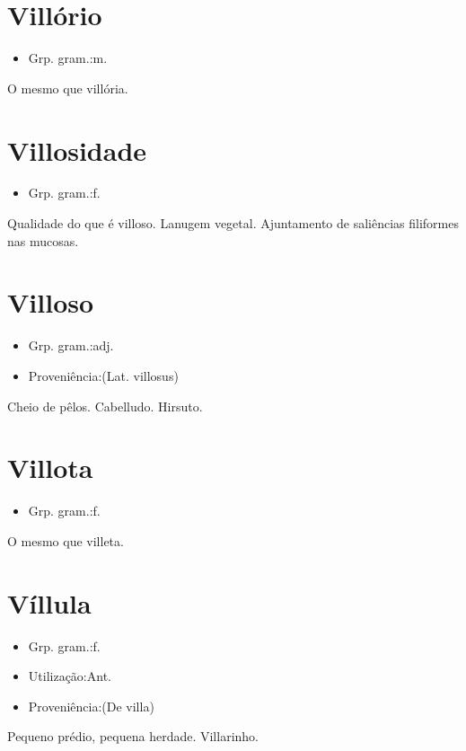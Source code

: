 \documentclass{article}
\begin{document}
\section{Villório}
\begin{itemize}
\item {Grp. gram.:m.}
\end{itemize}
O mesmo que \textunderscore villória\textunderscore .
\section{Villosidade}
\begin{itemize}
\item {Grp. gram.:f.}
\end{itemize}
Qualidade do que é villoso.
Lanugem vegetal.
Ajuntamento de saliências filiformes nas mucosas.
\section{Villoso}
\begin{itemize}
\item {Grp. gram.:adj.}
\end{itemize}
\begin{itemize}
\item {Proveniência:(Lat. \textunderscore villosus\textunderscore )}
\end{itemize}
Cheio de pêlos.
Cabelludo.
Hirsuto.
\section{Villota}
\begin{itemize}
\item {Grp. gram.:f.}
\end{itemize}
O mesmo que \textunderscore villeta\textunderscore .
\section{Víllula}
\begin{itemize}
\item {Grp. gram.:f.}
\end{itemize}
\begin{itemize}
\item {Utilização:Ant.}
\end{itemize}
\begin{itemize}
\item {Proveniência:(De \textunderscore villa\textunderscore )}
\end{itemize}
Pequeno prédio, pequena herdade.
Villarinho.
\end{document}
